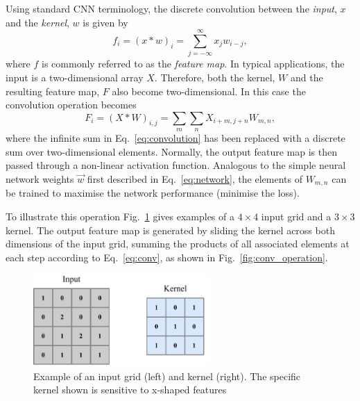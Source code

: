 Using standard CNN terminology, the discrete convolution between the \emph{input}, $x$ and the
\emph{kernel}, $w$ is given by
\begin{equation}
    f_{i}=(x*w)_{i}=\sum^{\infty}_{j=-\infty}x_{j}w_{i-j},
    \label{eq:convolution}
\end{equation}
where $f$ is commonly referred to as the \emph{feature map}. In typical applications, the input is
a two-dimensional array $X$. Therefore, both the kernel, $W$ and the resulting feature map, $F$
also become two-dimensional. In this case the convolution operation becomes
\begin{equation}
    F_{i}=(X*W)_{i,j}=\sum_{m}\sum_{n}X_{i+m,j+n}W_{m,n},
    \label{eq:conv}
\end{equation}
where the infinite sum in Eq.~\ref{eq:convolution} has been replaced with a discrete sum over
two-dimensional elements. Normally, the output feature map is then passed through a non-linear
activation function. Analogous to the simple neural network weights $\vec{w}$ first described in
Eq.~\ref{eq:network}, the elements of $W_{m,n}$ can be trained to maximise the network performance
(minimise the loss).

To illustrate this operation Fig.~\ref{fig:conv_input} gives examples of a $4 \times 4$ input grid
and a $3 \times 3$ kernel. The output feature map is generated by sliding the kernel across both
dimensions of the input grid, summing the products of all associated elements at each step
according to Eq.~\ref{eq:conv}, as shown in Fig.~\ref{fig:conv_operation}.

\begin{figure} %
    \includegraphics[width=0.6\textwidth]{diagrams/6-cvn/conv_input.pdf}
    \caption[Example of an input grid and kernel.]
    {Example of an input grid (left) and kernel (right). The specific kernel shown is sensitive to
        x-shaped features}
    \label{fig:conv_input}
\end{figure}

